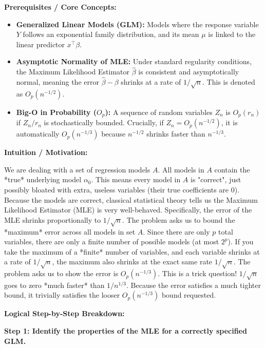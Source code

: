 \begin{solution}
\textbf{Prerequisites / Core Concepts:}
\begin{itemize}
    \item \textbf{Generalized Linear Models (GLM):} Models where the response variable $Y$ follows an exponential family distribution, and its mean $\mu$ is linked to the linear predictor $x^\top \beta$.
    \item \textbf{Asymptotic Normality of MLE:} Under standard regularity conditions, the Maximum Likelihood Estimator $\hat{\beta}$ is consistent and asymptotically normal, meaning the error $\hat{\beta} - \beta$ shrinks at a rate of $1/\sqrt{n}$. This is denoted as $O_p(n^{-1/2})$.
    \item \textbf{Big-O in Probability ($O_p$):} A sequence of random variables $Z_n$ is $O_p(r_n)$ if $Z_n / r_n$ is stochastically bounded. Crucially, if $Z_n = O_p(n^{-1/2})$, it is automatically $O_p(n^{-1/3})$ because $n^{-1/2}$ shrinks faster than $n^{-1/3}$.
\end{itemize}

\textbf{Intuition / Motivation:}

We are dealing with a set of regression models $A$. All models in $A$ contain the *true* underlying model $\alpha_0$. This means every model in $A$ is "correct", just possibly bloated with extra, useless variables (their true coefficients are 0).
Because the models are correct, classical statistical theory tells us the Maximum Likelihood Estimator (MLE) is very well-behaved. Specifically, the error of the MLE shrinks proportionally to $1/\sqrt{n}$.
The problem asks us to bound the *maximum* error across all models in set $A$.
Since there are only $p$ total variables, there are only a finite number of possible models (at most $2^p$).
If you take the maximum of a *finite* number of variables, and each variable shrinks at a rate of $1/\sqrt{n}$, the maximum also shrinks at the exact same rate $1/\sqrt{n}$.
The problem asks us to show the error is $O_p(n^{-1/3})$. This is a trick question! $1/\sqrt{n}$ goes to zero *much faster* than $1/n^{1/3}$. Because the error satisfies a much tighter bound, it trivially satisfies the looser $O_p(n^{-1/3})$ bound requested.

\textbf{Logical Step-by-Step Breakdown:}

\textbf{Step 1: Identify the properties of the MLE for a correctly specified GLM.}


\end{solution}
